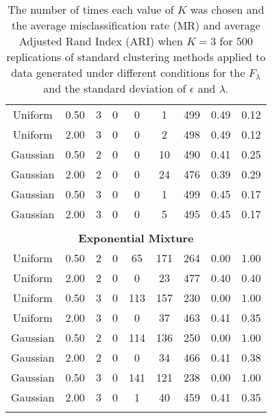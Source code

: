 \begin{table}[ht]
\begin{center}
\begin{tabular}{ccc|cccccc}
  Uniform & 0.50 &   3 &   0 &   0 &   1 & 499 & 0.49 & 0.12 \\ 
  Uniform & 2.00 &   3 &   0 &   0 &   2 & 498 & 0.49 & 0.12 \\ 
  Gaussian & 0.50 &   2 &   0 &   0 &  10 & 490 & 0.41 & 0.25 \\ 
  Gaussian & 2.00 &   2 &   0 &   0 &  24 & 476 & 0.39 & 0.29 \\ 
  Gaussian & 0.50 &   3 &   0 &   0 &   1 & 499 & 0.45 & 0.17 \\ 
  Gaussian & 2.00 &   3 &   0 &   0 &   5 & 495 & 0.45 & 0.17 \\ 
   \\ \multicolumn{9}{c}{\textbf{Exponential Mixture}}\\Uniform & 0.50 &   2 &   0 &  65 & 171 & 264 & 0.00 & 1.00 \\ 
  Uniform & 2.00 &   2 &   0 &   0 &  23 & 477 & 0.40 & 0.40 \\ 
  Uniform & 0.50 &   3 &   0 & 113 & 157 & 230 & 0.00 & 1.00 \\ 
  Uniform & 2.00 &   3 &   0 &   0 &  37 & 463 & 0.41 & 0.35 \\ 
  Gaussian & 0.50 &   2 &   0 & 114 & 136 & 250 & 0.00 & 1.00 \\ 
  Gaussian & 2.00 &   2 &   0 &   0 &  34 & 466 & 0.41 & 0.38 \\ 
  Gaussian & 0.50 &   3 &   0 & 141 & 121 & 238 & 0.00 & 1.00 \\ 
  Gaussian & 2.00 &   3 &   0 &   1 &  40 & 459 & 0.41 & 0.35 \\ 
   \thickhline\end{tabular}
\caption{The number of times each value of $K$ was chosen and the average misclassification rate (MR) and average Adjusted Rand Index (ARI) when $K=3$ for 500 replications of standard clustering methods applied to data generated under different conditions for the $F_{\lambda}$ and the standard deviation of $\epsilon$ and $\lambda$.}
\label{tab:freq1}
\end{center}
\end{table}


